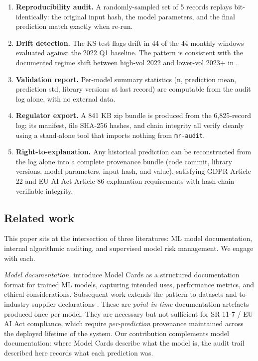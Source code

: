 \begin{enumerate}[leftmargin=*]
    \item \textbf{Reproducibility audit.} A randomly-sampled set of 5 records replays bit-identically: the original input hash, the model parameters, and the final prediction match exactly when re-run.
    \item \textbf{Drift detection.} The KS test flags drift in 44 of the 44 monthly windows evaluated against the 2022 Q1 baseline. The pattern is consistent with the documented regime shift between high-vol 2022 and lower-vol 2023+ in \citet{KhanVol2026}.
    \item \textbf{Validation report.} Per-model summary statistics (n, prediction mean, prediction std, library versions at last record) are computable from the audit log alone, with no external data.
    \item \textbf{Regulator export.} A 841 KB zip bundle is produced from the 6,825-record log; its manifest, file SHA-256 hashes, and chain integrity all verify cleanly using a stand-alone tool that imports nothing from \texttt{mr-audit}.
    \item \textbf{Right-to-explanation.} Any historical prediction can be reconstructed from the log alone into a complete provenance bundle (code commit, library versions, model parameters, input hash, and value), satisfying GDPR Article 22 and EU AI Act Article 86 explanation requirements with hash-chain-verifiable integrity.
\end{enumerate}

\subsection{Related work}\label{sec:related_work}

This paper sits at the intersection of three literatures: ML model documentation, internal algorithmic auditing, and supervised model risk management. We engage with each.

\textit{Model documentation.} \citet{MitchellModelCards2019} introduce Model Cards as a structured documentation format for trained ML models, capturing intended uses, performance metrics, and ethical considerations. Subsequent work extends the pattern to datasets \citep{GebruDatasheets2021, PushkarnaDataCards2022} and to industry-supplier declarations \citep{ArnoldFactSheets2019}. These are \emph{point-in-time} documentation artefacts produced once per model. They are necessary but not sufficient for SR 11-7 / EU AI Act compliance, which require \emph{per-prediction} provenance maintained across the deployed lifetime of the system. Our contribution complements model documentation: where Model Cards describe what the model is, the audit trail described here records what each prediction was.

